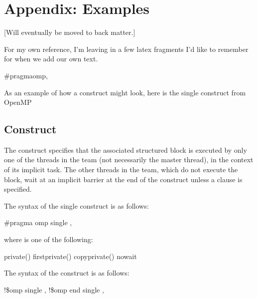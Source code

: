 \section{Appendix: Examples}
  [Will eventually be moved to back matter.]


For my own reference, I'm leaving in a few latex fragments I'd like to remember for when we add our own text.


\begin{boxedcode}
\#pragma\plc{ }omp\plc{ directive-name [clause[ [},\plc{] clause] ... ] new-line}
\end{boxedcode}

As an example of how a construct might look, here is the single construct from OpenMP

\subsection{ Construct}
\label{subsec:single Construct}
\summary
The  construct specifies that the associated structured block is executed by only 
one of the threads in the team (not necessarily the master thread), in the context of its 
implicit task. The other threads in the team, which do not execute the block, wait at an 
implicit barrier at the end of the  construct unless a  clause is specified.

\parbox{\linewidth}{%
\syntax
\ccppspecificstart}
The syntax of the single construct is as follows:

\begin{boxedcode}
\#pragma omp single \plc{[clause[ [},\plc{] clause] ... ] new-line}
\end{boxedcode}

\begin{samepage}
where  is one of the following:

\begin{indentedcodelist}
private()
firstprivate()
copyprivate()
nowait
\end{indentedcodelist}
\ccppspecificend
\end{samepage}

\fortranspecificstart
The syntax of the  construct is as follows:

\begin{boxedcode}
!\$omp single \plc{[clause[ [},\plc{] clause] ... ]}
!\$omp end single \plc{[end\_clause[ [},\plc{] end\_clause] ... ]}
\end{boxedcode}

